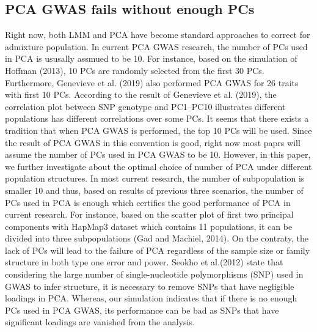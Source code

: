 \documentclass[12pt]{article}
\begin{document}
\subsection{PCA GWAS fails without enough PCs}
Right now, both LMM and PCA have become standard approaches to correct for admixture population. In current PCA GWAS research, the number of PCs used in PCA is ususally assmued to be 10. For instance, based on the simulation of Hoffman (2013), 10 PCs are randomly selected from the first 30 PCs. Furthermore, Genevieve et al. (2019) also performed PCA GWAS for 26 traits with first 10 PCs. According to the result of Genevieve et al. (2019), the correlation plot between SNP genotype and PC1–PC10 illustrates different populations has different correlations over some PCs. It seems that there exists a tradition that when PCA GWAS is performed, the top 10 PCs will be used. Since the result of PCA GWAS in this convention is good, right now most paprs will assume the number of PCs used in PCA GWAS to be 10. However, in this paper, we further investigate about the optimal choice of number of PCA under different population structures. In most current research, the number of subpopulation is smaller 10 and thus, based on results of previous three scenarios, the number of PCs used in PCA is enough which certifies the good performance of PCA  in current research. For instance, based on the scatter plot of first two principal components with HapMap3 dataset which contains 11 populations, it can be divided into three subpopulations (Gad and Machiel, 2014). On the contraty, the lack of PCs will lead to the failure of PCA regardless of the sample size or family structure in both type one error and power. Seokho et al.(2012) state that considering the large number of single-nucleotide polymorphisms (SNP) used in GWAS to infer structure, it is necessary to remove SNPs that have negligible loadings in PCA. Whereas, our simulation indicates that if there is no enough PCs used in PCA GWAS, its performance can be bad as SNPs that have significant loadings are vanished from the analysis.
\end{document}
